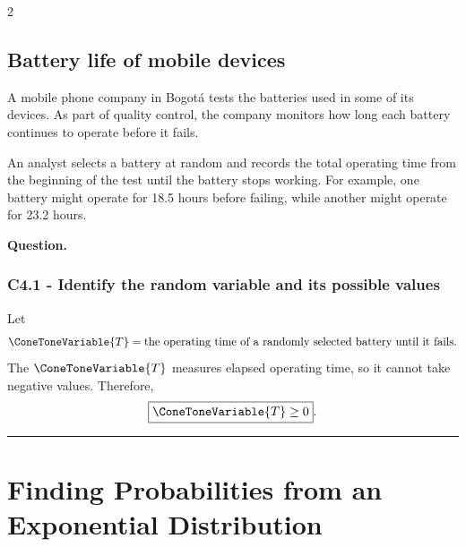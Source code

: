 \begin{multicols}{2}
	
\subsection{Battery life of mobile devices}\label{sec:c4-identify-battery}

A mobile phone company in Bogotá tests the batteries used in some of its
devices. As part of quality control, the company monitors how long each
battery continues to operate before it fails.

An analyst selects a battery at random and records the total operating time
from the beginning of the test until the battery stops working. For example,
one battery might operate for 18.5 hours before failing, while another might
operate for 23.2 hours.



\textbf{Question.}
\begin{enumerate}
\end{enumerate}

\columnbreak

\subsubsection*{C4.1 - Identify the random variable and its possible values}\label{subsec:c4-identify-battery-a}
Let
\[
\ConeToneVariable{T}=\text{the operating time of a randomly selected battery until it fails}.
\]
The   $\ConeToneVariable{T}$ measures elapsed operating time, so it cannot take
negative values. Therefore,
\[
\boxed{\ConeToneVariable{T}\geq0}.
\]

\end{multicols}

\noindent\rule{\textwidth}{0.4pt}

\newpage

\section{Finding Probabilities from an Exponential Distribution}\label{sec:c4-specific-probabilities}

